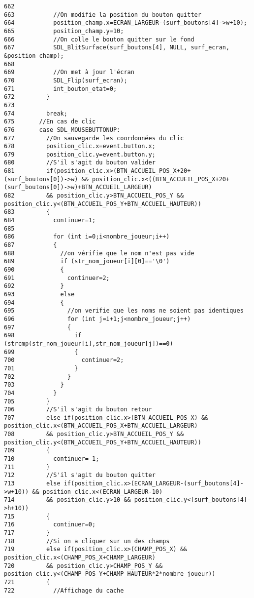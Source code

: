 \begin{Code}
\begin{verbatim}
662 
663           //On modifie la position du bouton quitter
664           position_champ.x=ECRAN_LARGEUR-(surf_boutons[4]->w+10);
665           position_champ.y=10;
666           //On colle le bouton quitter sur le fond
667           SDL_BlitSurface(surf_boutons[4], NULL, surf_ecran, &position_champ);
668 
669           //On met à jour l'écran
670           SDL_Flip(surf_ecran);
671           int_bouton_etat=0;
672         }
673         
674         break;
675       //En cas de clic
676       case SDL_MOUSEBUTTONUP:
677         //On sauvegarde les coordonnées du clic
678         position_clic.x=event.button.x;
679         position_clic.y=event.button.y;
680         //S'il s'agit du bouton valider
681         if(position_clic.x>(BTN_ACCUEIL_POS_X+20+(surf_boutons[0])->w) && position_clic.x<((BTN_ACCUEIL_POS_X+20+(surf_boutons[0])->w)+BTN_ACCUEIL_LARGEUR)
682         && position_clic.y>BTN_ACCUEIL_POS_Y && position_clic.y<(BTN_ACCUEIL_POS_Y+BTN_ACCUEIL_HAUTEUR))
683         {
684           continuer=1;
685                 
686           for (int i=0;i<nombre_joueur;i++)
687           {
688             //on vérifie que le nom n'est pas vide
689             if (str_nom_joueur[i][0]=='\0')
690             {
691               continuer=2;
692             }
693             else
694             {
695               //on verifie que les noms ne soient pas identiques            
696               for (int j=i+1;j<nombre_joueur;j++)
697               {
698                 if (strcmp(str_nom_joueur[i],str_nom_joueur[j])==0)
699                 {
700                   continuer=2;
701                 }
702               }
703             }
704           }
705         }
706         //S'il s'agit du bouton retour
707         else if(position_clic.x>(BTN_ACCUEIL_POS_X) && position_clic.x<(BTN_ACCUEIL_POS_X+BTN_ACCUEIL_LARGEUR)
708         && position_clic.y>BTN_ACCUEIL_POS_Y && position_clic.y<(BTN_ACCUEIL_POS_Y+BTN_ACCUEIL_HAUTEUR))
709         {
710           continuer=-1;
711         }
712         //S'il s'agit du bouton quitter
713         else if(position_clic.x>(ECRAN_LARGEUR-(surf_boutons[4]->w+10)) && position_clic.x<(ECRAN_LARGEUR-10)
714         && position_clic.y>10 && position_clic.y<(surf_boutons[4]->h+10))
715         {
716           continuer=0;
717         }
718         //Si on a cliquer sur un des champs
719         else if(position_clic.x>(CHAMP_POS_X) && position_clic.x<(CHAMP_POS_X+CHAMP_LARGEUR)
720         && position_clic.y>CHAMP_POS_Y && position_clic.y<(CHAMP_POS_Y+CHAMP_HAUTEUR*2*nombre_joueur))
721         {
722           //Affichage du cache

\end{verbatim}
\end{Code}
